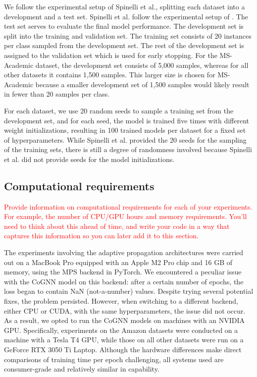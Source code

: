 \documentclass{gdl}
\begin{document}
We follow the experimental setup of Spinelli et al., splitting each dataset into a development and a test set. Spinelli et al. follow the experimental setup of \cite{Klicpera2019}. The test set serves to evaluate the final model performance. The development set is split into the training and validation set. The training set consists of 20 instances per class sampled from the development set. The rest of the development set is assigned to the validation set which is used for early stopping. For the MS-Academic dataset, the development set consists of 5,000 samples, whereas for all other datasets it contains 1,500 samples. This larger size is chosen for MS-Academic because a smaller development set of 1,500 samples would likely result in fewer than 20 samples per class. 

For each dataset, we use 20 random seeds to sample a training set from the development set, and for each seed, the model is trained five times with different weight initializations, resulting in 100 trained models per dataset for a fixed set of hyperparameters. While Spinelli et al. provided the 20 seeds for the sampling of the training sets, there is still a degree of randomness involved because Spinelli et al. did not provide seeds for the model initializations.

\subsection{Computational requirements}
\textcolor{red}{Provide information on computational requirements for each of your experiments. For example, the number of CPU/GPU hours and memory requirements. You'll need to think about this ahead of time, and write your code in a way that captures this information so you can later add it to this section. }

The experiments involving the adaptive propagation architectures were carried out on a MacBook Pro equipped with an Apple M2 Pro chip and 16 GB of memory, using the MPS backend in PyTorch. We encountered a peculiar issue with the CoGNN model on this backend: after a certain number of epochs, the loss began to contain NaN (not-a-number) values. Despite trying several potential fixes, the problem persisted. However, when switching to a different backend, either CPU or CUDA, with the same hyperparameters, the issue did not occur. As a result, we opted to run the CoGNN models on machines with an NVIDIA GPU. Specifically, experiments on the Amazon datasets were conducted on a machine with a Tesla T4 GPU, while those on all other datasets were run on a GeForce RTX 3050 Ti Laptop. Although the hardware differences make direct comparisons of training time per epoch challenging, all systems used are consumer-grade and relatively similar in capability.
\end{document}
